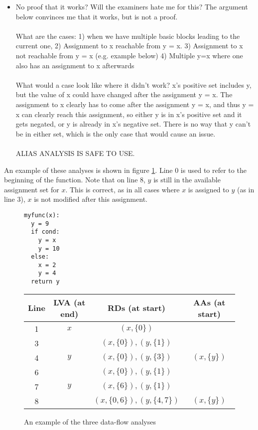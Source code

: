 \documentclass[12pt,twoside,notitlepage]{report}
\begin{document}
\begin{itemize}
{\begin{itemize}
			\item No proof that it works? Will the examiners hate me for this? The argument below convinces me that it works, but is not a proof.\\\\What are the cases: 1) when we have multiple basic blocks leading to the current one, 2) Assignment to x reachable from y = x. 3) Assignment to x not reachable from y = x (e.g. example below) 4) Multiple y=x where one also has an assignment to x afterwards
			\\\\
			What would a case look like where it didn't work? x's positive set includes y, but the value of x could have changed after the assignment y = x. The assignment to x clearly has to come after the assignment y = x, and thus y = x can clearly reach this assignment, so either y is in x's positive set and it gets negated, or y is already in x's negative set. There is no way that y can't be in either set, which is the only case that would cause an issue.
			\\\\
			ALIAS ANALYSIS IS SAFE TO USE.
	\end{itemize}}
\end{itemize}
An example of these analyses is shown in figure \ref{fig:dataflow}. Line 0 is used to refer to the beginning of the function. Note that on line 8, $y$ is still in the available assignment set for $x$. This is correct, as in all cases where $x$ is assigned to $y$ (as in line 3), $x$ is not modified after this assignment.
\begin{figure}[h]
	\begin{minipage}{0.3\linewidth}
	\begin{verbatim}
myfunc(x):
  y = 9
  if cond:
    y = x
    y = 10
  else:
    x = 2
    y = 4
  return y
	\end{verbatim}
	\end{minipage}
	\begin{minipage}{0.7\linewidth}
		\begin{center}
			\begin{tabular}{|c|c|c|c|}
				\hline
				Line & LVA (at end) & RDs (at start) & AAs (at start) \\
				\hline
				1 & $x$ & $(x, \{0\})$ & \\
				\hline
				3 & & $(x, \{0\}), (y, \{1\})$ & \\
				4 & $y$ & $(x, \{0\}), (y, \{3\})$ & $(x, \{y\})$ \\
				\hline
				6 & & $(x, \{0\}), (y, \{1\})$ & \\
				7 & $y$ & $(x, \{6\}), (y, \{1\})$ & \\
				\hline
				8 & & $(x, \{0, 6\}), (y, \{4, 7\})$ & $(x, \{y\})$ \\
				\hline
			\end{tabular}
		\end{center}
	\end{minipage}
	\caption{An example of the three data-flow analyses}
	\label{fig:dataflow}
\end{figure}
\end{document}
